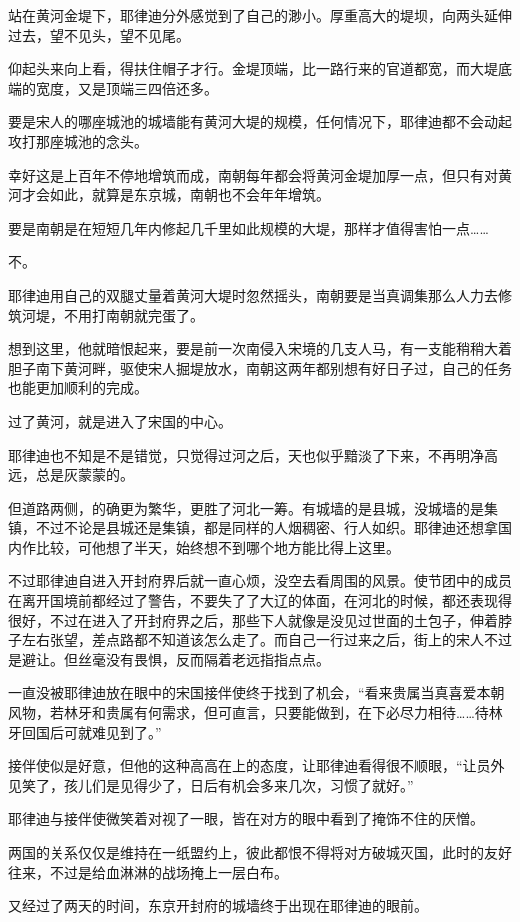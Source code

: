 站在黄河金堤下，耶律迪分外感觉到了自己的渺小。厚重高大的堤坝，向两头延伸过去，望不见头，望不见尾。

仰起头来向上看，得扶住帽子才行。金堤顶端，比一路行来的官道都宽，而大堤底端的宽度，又是顶端三四倍还多。

要是宋人的哪座城池的城墙能有黄河大堤的规模，任何情况下，耶律迪都不会动起攻打那座城池的念头。

幸好这是上百年不停地增筑而成，南朝每年都会将黄河金堤加厚一点，但只有对黄河才会如此，就算是东京城，南朝也不会年年增筑。

要是南朝是在短短几年内修起几千里如此规模的大堤，那样才值得害怕一点……

不。

耶律迪用自己的双腿丈量着黄河大堤时忽然摇头，南朝要是当真调集那么人力去修筑河堤，不用打南朝就完蛋了。

想到这里，他就暗恨起来，要是前一次南侵入宋境的几支人马，有一支能稍稍大着胆子南下黄河畔，驱使宋人掘堤放水，南朝这两年都别想有好日子过，自己的任务也能更加顺利的完成。

过了黄河，就是进入了宋国的中心。

耶律迪也不知是不是错觉，只觉得过河之后，天也似乎黯淡了下来，不再明净高远，总是灰蒙蒙的。

但道路两侧，的确更为繁华，更胜了河北一筹。有城墙的是县城，没城墙的是集镇，不过不论是县城还是集镇，都是同样的人烟稠密、行人如织。耶律迪还想拿国内作比较，可他想了半天，始终想不到哪个地方能比得上这里。

不过耶律迪自进入开封府界后就一直心烦，没空去看周围的风景。使节团中的成员在离开国境前都经过了警告，不要失了了大辽的体面，在河北的时候，都还表现得很好，不过在进入了开封府界之后，那些下人就像是没见过世面的土包子，伸着脖子左右张望，差点路都不知道该怎么走了。而自己一行过来之后，街上的宋人不过是避让。但丝毫没有畏惧，反而隔着老远指指点点。

一直没被耶律迪放在眼中的宋国接伴使终于找到了机会，“看来贵属当真喜爱本朝风物，若林牙和贵属有何需求，但可直言，只要能做到，在下必尽力相待……待林牙回国后可就难见到了。”

接伴使似是好意，但他的这种高高在上的态度，让耶律迪看得很不顺眼，“让员外见笑了，孩儿们是见得少了，日后有机会多来几次，习惯了就好。”

耶律迪与接伴使微笑着对视了一眼，皆在对方的眼中看到了掩饰不住的厌憎。

两国的关系仅仅是维持在一纸盟约上，彼此都恨不得将对方破城灭国，此时的友好往来，不过是给血淋淋的战场掩上一层白布。

又经过了两天的时间，东京开封府的城墙终于出现在耶律迪的眼前。

